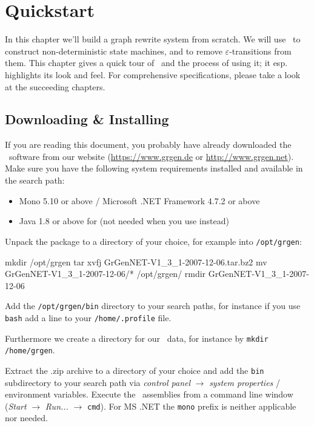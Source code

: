 \chapter{Quickstart}

In this chapter we'll build a graph rewrite system from scratch.
We will use \GrG\ to construct non-deterministic state machines, and to remove $\varepsilon$-transitions from them.
This chapter gives a quick tour of \GrG\ and the process of using it; it esp. highlights its look and feel.
For comprehensive specifications, please take a look at the succeeding chapters.


\section{Downloading \& Installing}

If you are reading this document, you probably have already downloaded the \GrG\ software from our website (\url{https://www.grgen.de} or \url{http://www.grgen.net}). Make sure you have the following system requirements installed and available in the search path:
\begin{itemize}
	\item Mono 5.10 or above / Microsoft .NET Framework 4.7.2 or above
	\item Java 1.8 or above for \yComp{} (not needed when you use \MSAGL{} instead)
\end{itemize}

Unpack the package to a directory of your choice, for example into \texttt{/opt/grgen}:
\begin{bash}
mkdir /opt/grgen
tar xvfj GrGenNET-V1_3_1-2007-12-06.tar.bz2
mv GrGenNET-V1_3_1-2007-12-06/* /opt/grgen/
rmdir GrGenNET-V1_3_1-2007-12-06
\end{bash}
Add the \texttt{/opt/grgen/bin} directory to your search paths, for instance if you use \texttt{bash} add a line to your \texttt{/home/.profile} file.
Furthermore we create a directory for our \GrG\ data, for instance by \texttt{mkdir /home/grgen}.

\vspace{2mm}
Extract the .zip archive to a directory of your choice and add the \texttt{bin} subdirectory to your search path via \emph{control panel} $\rightarrow$ \emph{system properties} / environment variables.
Execute the \GrG\ assemblies from a command line window (\emph{Start} $\rightarrow$ \emph{Run...} $\rightarrow$ \texttt{cmd}).
For MS .NET the \texttt{mono} prefix is neither applicable nor needed.

